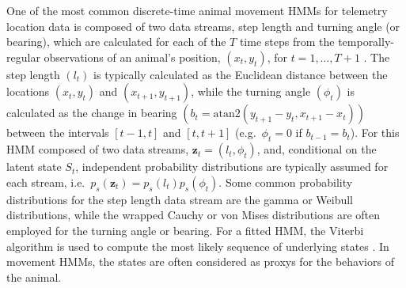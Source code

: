 \documentclass[12pt]{article}\usepackage[]{graphicx}\usepackage[]{color}
\begin{document}
One of the most common discrete-time animal movement HMMs for telemetry location data is composed of two data streams, step length and turning angle (or bearing), which are calculated for each of the $T$ time steps from the temporally-regular observations of an animal's position, $(x_t,y_t)$, for $t=1,\ldots,T+1$ \citep[e.g.][]{MoralesEtAl2004,McClintockEtAl2012}. The step length $(l_t)$ is typically calculated as the Euclidean distance between the locations $(x_t,y_t)$ and $(x_{t+1},y_{t+1})$, while the turning angle $(\phi_t)$ is calculated as the change in bearing $\left(b_t=\text{atan2}(y_{t+1}-y_t,x_{t+1}-x_t)\right)$ between the intervals $[t-1,t]$ and $[t,t+1]$ (e.g.\ $\phi_t=0$ if $b_{t-1}=b_t$). For this HMM composed of two data streams, ${\mathbf z}_t=(l_t,\phi_t)$, and, conditional on the latent state $S_t$, independent probability distributions are typically assumed for each stream, i.e.\ $p_s({\mathbf z}_t)=p_s(l_t)p_s(\phi_t)$. Some common probability distributions for the step length data stream are the gamma or Weibull distributions, while the wrapped Cauchy or von Mises distributions are often employed for the turning angle or bearing. For a fitted HMM, the Viterbi algorithm is used to compute the most likely sequence of underlying states \citep{ZucchiniEtAl2016}. In movement HMMs, the states are often considered as proxys for the behaviors of the animal.
\end{document}

